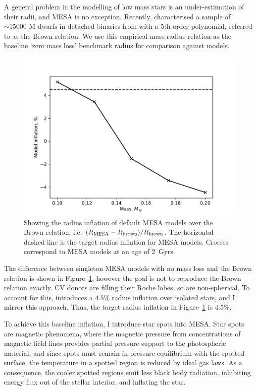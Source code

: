 A general problem in the modelling of low mass stars is an under-estimation of their radii, and MESA is no exception. Recently, \citet{BrownPrep} characterised a sample of $\sim 15000$ M dwarfs in detached binaries from \citet{parsons2018} with a 5th order polynomial, referred to as the Brown relation. We use this empirical mass-radius relation as the baseline `zero mass loss' benchmark radius for comparison against models.
\begin{figure}
    \centering
    \includegraphics[width=\textwidth]{figures/modelling/MESA_inflation_over_brown.pdf}
    \caption{Showing the radius inflation of default MESA models over the Brown relation, i.e. $(R_{\rm MESA} - R_{\rm brown}) / R_{\rm brown}$. The horizontal dashed line is the target radius inflation for MESA models. Crosses correspond to MESA models at an age of 2~Gyrs.}
    \label{fig:modelling:MESA inflation over Brown relation}
\end{figure}
The difference between singleton MESA models with no mass loss and the Brown relation is shown in Figure~\ref{fig:modelling:MESA inflation over Brown relation}, however the goal is not to reproduce the Brown relation exactly.
CV donors are filling their Roche lobes, so are non-spherical. To account for this, \citet{knigge11} introduces a $4.5\%$ radius inflation over isolated stars, and I mirror this approach. Thus, the target radius inflation in Figure~\ref{fig:modelling:MESA inflation over Brown relation} is $4.5\%$.

To achieve this baseline inflation, I introduce star spots into MESA. Star spots are magnetic phenomena, where the magnetic pressure from concentrations of magnetic field lines provides partial pressure support to the photospheric material, and since spots must remain in pressure equilibrium with the spotted surface, the temperature in a spotted region is reduced by ideal gas laws. As a consequence, the cooler spotted regions emit less black body radiation, inhibiting energy flux out of the stellar interior, and inflating the star.

